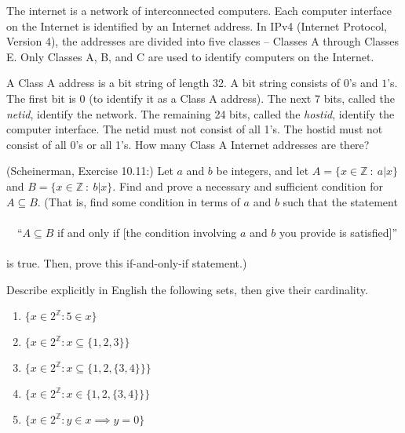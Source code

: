 \documentclass{article}
\theoremstyle{definition}
\begin{document}
\begin{question}
    The internet is a network of interconnected computers. Each computer interface on the Internet is identified by an Internet address. In IPv4 (Internet Protocol, Version 4), the addresses are divided into five classes -- Classes A through Classes E. Only Classes A, B, and C are used to identify computers on the Internet.
    
    A Class A address is a bit string of length 32. A bit string consists of $0$'s and $1$'s. The first bit is 0 (to identify it as a Class A address). The next 7 bits, called the \textit{netid}, identify the network. The remaining 24 bits, called the \textit{hostid}, identify the computer interface. The netid must not consist of all 1's. The hostid must not consist of all 0's or all 1's. How many Class A Internet addresses are there?
\end{question}
\begin{solution}
\end{solution}


\begin{question}
   (Scheinerman, Exercise 10.11:)
   Let $a$ and $b$ be integers, and let $A = \{x \in \mathbb{Z} ~:~ a|x\}$ and $B = \{ x\in\mathbb{Z} ~:~ b|x\}$.  
   Find and prove a necessary and sufficient condition for $A \subseteq B$.
   (That is, find some condition in terms of $a$ and $b$ such that the statement\\~\\
   $~~~$ ``$A \subseteq B$ if and only if [the condition involving $a$ and $b$ you provide is satisfied]''\\~\\
   is true.  Then, prove this if-and-only-if statement.)
\end{question}
\begin{solution}
\end{solution}

\begin{question}
Describe explicitly in English the following sets, then give their cardinality.

\begin{enumerate}
	\item $\{x \in 2^{\mathbb{Z}} : 5 \in x \}$
	\item $\{x \in 2^{\mathbb{Z}} : x \subseteq \{ 1, 2, 3\} \}$
	\item $\{x \in 2^{\mathbb{Z}} : x \subseteq \{ 1, 2, \{3, 4\} \} \}$
	\item $\{x \in 2^{\mathbb{Z}} : x \in \{ 1, 2, \{3, 4\} \} \}$
	\item $\{x \in 2^{\mathbb{Z}} : y \in x \implies y = 0 \}$
\end{enumerate}
\end{question}
\begin{solution}
\end{solution}
\end{document}
